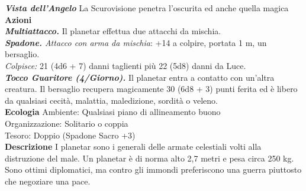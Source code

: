 \begin{multicols}{2}
\emph{\textbf{Vista dell'Angelo}} La Scurovisione penetra l'oscurita ed anche quella magica\\
\smallskip\textbf{Azioni}\\
\emph{\textbf{Multiattacco.}} Il planetar effettua due attacchi da mischia.\\
\emph{\textbf{Spadone.} Attacco con arma da mischia}: +14 a colpire, portata 1 m, un bersaglio.\\
\emph{Colpisce:} 21 (4d6 + 7) danni taglienti più 22 (5d8) danni da Luce.\\
\emph{\textbf{Tocco Guaritore (4/Giorno).}} Il planetar entra a contatto con un'altra creatura. Il bersaglio recupera magicamente 30 (6d8 + 3) punti ferita ed è libero da qualsiasi cecità, malattia, maledizione, sordità o veleno.\\
\textbf{Ecologia}
Ambiente: Qualsiasi piano di allineamento buono\\
Organizzazione: Solitario o coppia\\
Tesoro: Doppio (Spadone Sacro +3)\\
\textbf{Descrizione}
I planetar sono i generali delle armate celestiali volti alla distruzione del male. Un planetar è di norma alto 2,7 metri e pesa circa 250 kg. Sono ottimi diplomatici, ma contro gli immondi preferiscono una guerra piuttosto che negoziare una pace.\\


\end{multicols}
